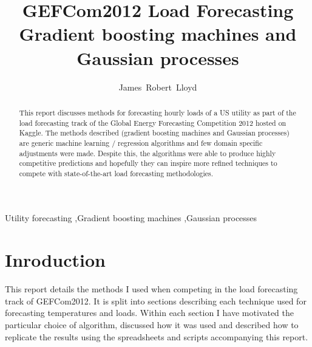\documentclass[preprint,authoryear,12pt]{elsarticle}
\begin{document}
\begin{frontmatter}


\title{GEFCom2012 Load Forecasting \\ Gradient boosting machines and Gaussian processes}
\author{James~Robert~Lloyd}
\address{Department of Engineering, University of Cambridge}


\author{}

\address{}

\begin{abstract}
This report discusses methods for forecasting hourly loads of a US utility as part of the load forecasting track of the Global Energy Forecasting Competition 2012 hosted on Kaggle.
The methods described (gradient boosting machines and Gaussian processes) are generic machine learning / regression algorithms and few domain specific adjustments were made.
Despite this, the algorithms were able to produce highly competitive predictions and hopefully they can inspire more refined techniques to compete with state-of-the-art load forecasting methodologies.
\end{abstract}

\begin{keyword}
Utility forecasting \sep Gradient boosting machines \sep Gaussian processes
\end{keyword}

\end{frontmatter}

\section{Inroduction}

This report details the methods I used when competing in the load forecasting track of GEFCom2012\footnotemark.
It is split into sections describing each technique used for forecasting temperatures and loads.
Within each section I have motivated the particular choice of algorithm, discussed how it was used and described how to replicate the results using the spreadsheets and scripts accompanying this report\footnotemark.
\end{document}

